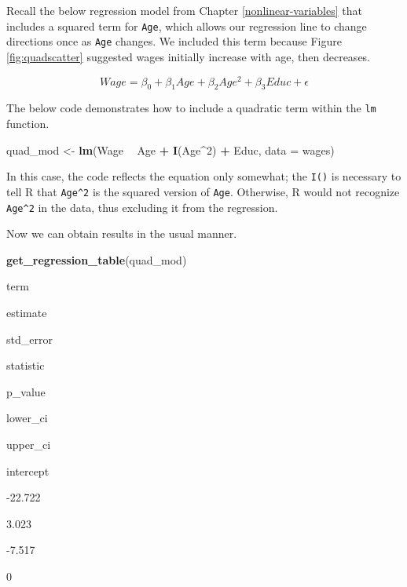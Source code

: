 \documentclass[
]{book}
\newenvironment{Shaded}{\begin{snugshade}}{\end{snugshade}}
\newcommand{\DataTypeTok}[1]{\textcolor[rgb]{0.13,0.29,0.53}{#1}}
\newcommand{\DecValTok}[1]{\textcolor[rgb]{0.00,0.00,0.81}{#1}}
\newcommand{\KeywordTok}[1]{\textcolor[rgb]{0.13,0.29,0.53}{\textbf{#1}}}
\newcommand{\NormalTok}[1]{#1}
\newcommand{\OperatorTok}[1]{\textcolor[rgb]{0.81,0.36,0.00}{\textbf{#1}}}
\newcommand{\StringTok}[1]{\textcolor[rgb]{0.31,0.60,0.02}{#1}}
\begin{document}
Recall the below regression model from Chapter \ref{nonlinear-variables} that includes a squared term for \texttt{Age}, which allows our regression line to change directions once as \texttt{Age} changes. We included this term because Figure \ref{fig:quadscatter} suggested wages initially increase with age, then decreases.

\begin{equation}
Wage = \beta_0 + \beta_1Age + \beta_2Age^2 + \beta_3Educ + \epsilon
\end{equation}

The below code demonstrates how to include a quadratic term within the \texttt{lm} function.

\begin{Shaded}
\begin{Highlighting}[]
\NormalTok{quad_mod <-}\StringTok{ }\KeywordTok{lm}\NormalTok{(Wage }\OperatorTok{~}\StringTok{ }\NormalTok{Age }\OperatorTok{+}\StringTok{ }\KeywordTok{I}\NormalTok{(Age}\OperatorTok{^}\DecValTok{2}\NormalTok{) }\OperatorTok{+}\StringTok{ }\NormalTok{Educ, }\DataTypeTok{data =}\NormalTok{ wages)}
\end{Highlighting}
\end{Shaded}

In this case, the code reflects the equation only somewhat; the \texttt{I()} is necessary to tell R that \texttt{Age\^{}2} is the squared version of \texttt{Age}. Otherwise, R would not recognize \texttt{Age\^{}2} in the data, thus excluding it from the regression.

Now we can obtain results in the usual manner.

\begin{Shaded}
\begin{Highlighting}[]
\KeywordTok{get_regression_table}\NormalTok{(quad_mod)}
\end{Highlighting}
\end{Shaded}

term

estimate

std\_error

statistic

p\_value

lower\_ci

upper\_ci

intercept

-22.722

3.023

-7.517

0
\end{document}
